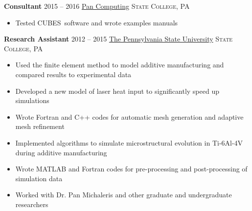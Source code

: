 \documentclass[10pt,letterpaper]{article}
\begin{document}
\noindent \textbf{Consultant} \hfill 2015 -- 2016 \break
\href{http://www.pancomputing.com}{Pan Computing} \hfill \textsc{State College, PA}
\begin{itemize}
	\item Tested CUBES\textsuperscript\textregistered\ software and wrote examples manuals
\end{itemize}


\noindent \textbf{Research Assistant} \hfill 2012 -- 2015 \break
\href{https://www.psu.edu}{The Pennsylvania State University} \hfill \textsc{State College, PA}
\begin{itemize}
	\item Used the finite element method to model additive manufacturing and compared results to experimental data
	\item Developed a new model of laser heat input to significantly speed up simulations
	\item Wrote Fortran and C++ codes for automatic mesh generation and adaptive mesh refinement
	\item Implemented algorithms to simulate microstructural evolution in Ti-6Al-4V during additive manufacturing
	\item Wrote MATLAB and Fortran codes for pre-processing and post-processing of simulation data
	\item Worked with Dr. Pan Michaleris and other graduate and undergraduate researchers
\end{itemize}

\spacedhrule{0.5em}{0.5em}

\spacedhrule{0.5em}{0.5em}


\spacedhrule{0.5em}{0.5em}
\end{document}
